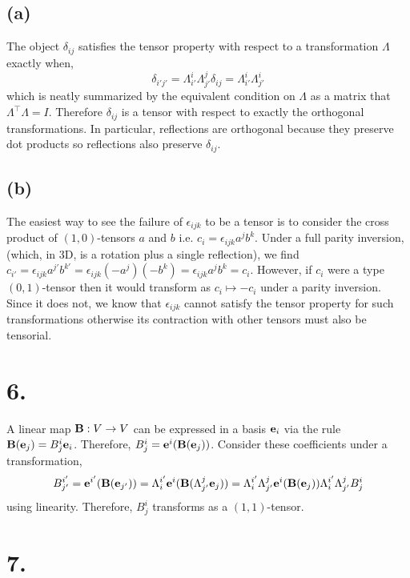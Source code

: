 \documentclass[12pt]{article}
\begin{document}
\subsection*{(a)}

The object $\delta_{ij}$ satisfies the tensor property with respect to a transformation $\Lambda$ exactly when,
\[ \delta_{i'j'} = \Lambda^{i}_{i'} \Lambda^{j}_{j'} \delta_{ij} = \Lambda^{i}_{i'} \Lambda^{i}_{j'} \]
which is neatly summarized by the equivalent condition on $\Lambda$ as a matrix that $\Lambda^{\top} \Lambda = I$. Therefore $\delta_{ij}$ is a tensor with respect to exactly the orthogonal transformations. In particular, reflections are orthogonal because they preserve dot products so reflections also preserve $\delta_{ij}$. 

\subsection*{(b)}

The easiest way to see the failure of $\epsilon_{ijk}$ to be a tensor is to consider the cross product of $(1,0)$-tensors $a$ and $b$ i.e. $c_i = \epsilon_{ijk} a^j b^k$. Under a full parity inversion, (which, in 3D, is a rotation plus a single reflection), we find $c_{i'} = \epsilon_{ijk} a^{j'} b^{k'} =   \epsilon_{ijk} (-a^j)(-b^k) = \epsilon_{ijk} a^j b^k = c_i$. However, if $c_i$ were a type $(0,1)$-tensor then it would transform as $c_i \mapsto - c_i$ under a parity inversion. Since it does not, we know that $\epsilon_{ijk}$ cannot satisfy the tensor property for such transformations otherwise its contraction with other tensors must also be tensorial. 

\section*{6.}

A linear map $\bf{B} : V \to V$ can be expressed in a basis $\bf{e}_i$ via the rule $\bf{B}(\bf{e}_j) = B^i_j \bf{e}_i$. Therefore, $B^i_j = \bf{e}^i(\bf{B}(\bf{e}_j))$. Consider these coefficients under a transformation,
\[ B^{i'}_{j'} = \bf{e}^{i'}(\bf{B}(\bf{e}_{j'})) = \Lambda^{i'}_i \bf{e}^{i}(\bf{B}(\Lambda^j_{j'} \bf{e}_j)) = \Lambda^{i'}_i \Lambda^j_{j'} \bf{e}^{i}(\bf{B}(\bf{e}_j)) \Lambda^{i'}_i \Lambda^j_{j'} B^i_j \]
using linearity. Therefore, $B^i_j$ transforms as a $(1, 1)$-tensor. 

\section*{7.}  
\end{document}
